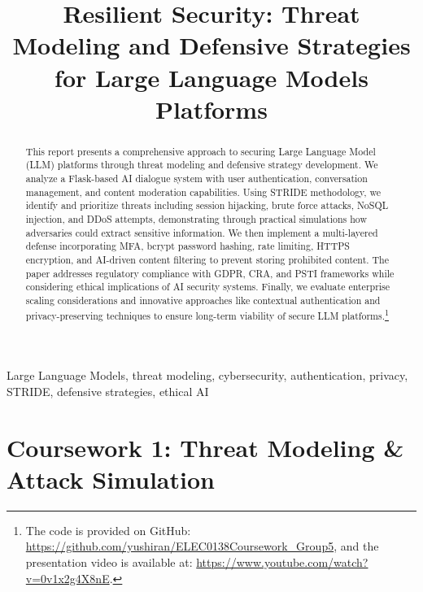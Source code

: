 \documentclass{article}
\title{Resilient Security: Threat Modeling and Defensive Strategies for Large Language Models Platforms}
\begin{document}
\maketitle
%
\begin{abstract}
    This report presents a comprehensive approach to securing Large Language Model (LLM) platforms through threat modeling and defensive strategy development. We analyze a Flask-based AI dialogue system with user authentication, conversation management, and content moderation capabilities. 
    Using STRIDE methodology, we identify and prioritize threats including session hijacking, brute force attacks, NoSQL injection, and DDoS attempts, demonstrating through practical simulations how adversaries could extract sensitive information. 
    We then implement a multi-layered defense incorporating MFA, bcrypt password hashing, rate limiting, HTTPS encryption, and AI-driven content filtering to prevent storing prohibited content. 
    The paper addresses regulatory compliance with GDPR, CRA, and PSTI frameworks while considering ethical implications of AI security systems. 
    Finally, we evaluate enterprise scaling considerations and innovative approaches like contextual authentication and privacy-preserving techniques to ensure long-term viability of secure LLM platforms.\footnote{The code is provided on GitHub: \url{https://github.com/yushiran/ELEC0138Coursework\_Group5}, and the presentation video is available at: \url{https://www.youtube.com/watch?v=0v1x2g4X8nE}.}
\end{abstract}
%
\begin{keywords}
    Large Language Models, threat modeling, cybersecurity, authentication, privacy, STRIDE, defensive strategies, ethical AI
\end{keywords}

\section{Coursework 1: Threat Modeling \& Attack Simulation}
\end{document}
